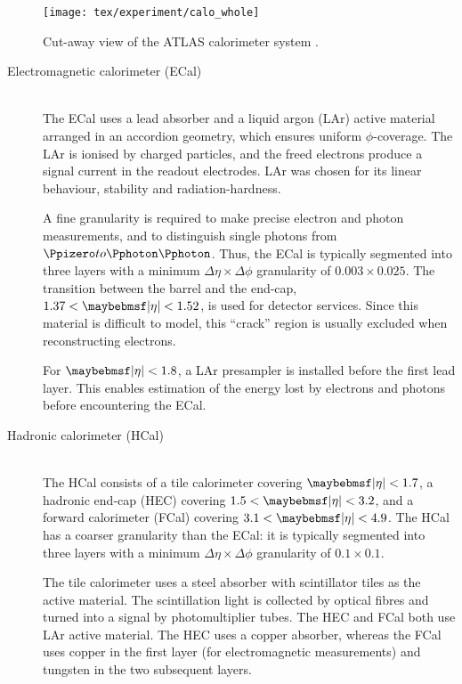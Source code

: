 \begin{figure}[t]
	\texttt{[image: tex/experiment/calo\_whole]}
	\caption{Cut-away view of the ATLAS calorimeter system \cite{ATLAS-detector}.}
	\label{fig:calorimeters}
\end{figure}

\begin{description}
\item[Electromagnetic calorimeter (ECal)] \hfill \\
	The ECal uses a lead absorber and a liquid argon (LAr) active material arranged 
	in an accordion geometry, which ensures uniform $\phi$-coverage. The LAr is ionised 
	by charged particles, and the freed electrons produce a signal current in the readout 
	electrodes. LAr was chosen for its linear behaviour, stability and radiation-hardness.

	A fine granularity is required to make precise electron and photon measurements, and 
	to distinguish single photons from $\HepProcess{\Ppizero \HepTo \Pphoton \Pphoton}$. 
	Thus, the ECal is typically segmented into three layers with a minimum 
	$\Delta\eta\times\Delta\phi$ granularity of $0.003 \times 0.025$. The transition 
	between the barrel and the end-cap, $1.37 < \mods{\eta} < 1.52$, is used for detector 
	services. Since this material is difficult to model, this ``crack'' region is usually 
	excluded when reconstructing electrons.

	For $\mods{\eta} < 1.8$, a LAr presampler is installed before the first lead layer. 
	This enables estimation of the energy lost by electrons and photons before 
	encountering the ECal.
\item[Hadronic calorimeter (HCal)] \hfill \\
	The HCal consists of a tile calorimeter covering $\mods{\eta} < 1.7$, a hadronic 
	end-cap (HEC) covering $1.5 < \mods{\eta} < 3.2$, and a forward calorimeter (FCal) 
	covering $3.1 < \mods{\eta} < 4.9$. The HCal has a coarser granularity than the
	ECal: it is typically segmented into three layers with a minimum 
	$\Delta\eta\times\Delta\phi$ granularity of $0.1 \times 0.1$.

	The tile calorimeter uses a steel absorber with scintillator tiles as the active 
	material. The scintillation light is collected by optical fibres and turned into a 
	signal by photomultiplier tubes. The HEC and FCal both use LAr active material.
	The HEC uses a copper absorber, whereas the FCal uses copper in the first layer (for 
	electromagnetic measurements) and tungsten in the two subsequent layers.
\end{description}



